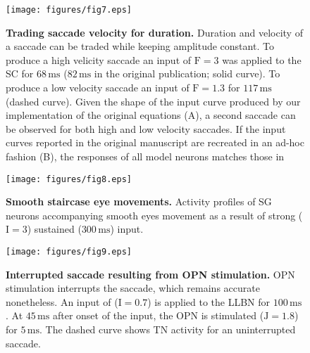\documentclass[10pt,a4paper,onecolumn]{article}
\renewcommand{\includegraphics}[2][]{\OldIncludegraphics[width=12cm, #1]{#2}}
\begin{document}
\begin{figure}
\centering
\texttt{[image: figures/fig7.eps]}
\caption{\textbf{Trading saccade velocity for duration.} Duration and
velocity of a saccade can be traded while keeping amplitude constant. To
produce a high velicity saccade an input of \(\mathrm{F=3}\) was applied
to the SC for \(68\,\mathrm{ms}\) (\(82\,\mathrm{ms}\) in the original
publication; solid curve). To produce a low velocity saccade an input of
\(\mathrm{F=1.3}\) for \(117\,\mathrm{ms}\) (dashed curve). Given the
shape of the input curve produced by our implementation of the original
equations (A), a second saccade can be observed for both high and low
velocity saccades. If the input curves reported in the original
manuscript are recreated in an ad-hoc fashion (B), the responses of all
model neurons matches those in \autocite{Gancarz1998}\label{fig:fig_7}}
\end{figure}

\begin{figure}
\centering
\texttt{[image: figures/fig8.eps]}
\caption{\textbf{Smooth staircase eye movements.} Activity profiles of
SG neurons accompanying smooth eyes movement as a result of strong
(\(\mathrm{I=3}\)) sustained (\(300\,\mathrm{ms}\))
input.\label{fig:fig_8}}
\end{figure}

\pagebreak

\begin{figure}
\centering
\texttt{[image: figures/fig9.eps]}
\caption{\textbf{Interrupted saccade resulting from OPN stimulation.}
OPN stimulation interrupts the saccade, which remains accurate
nonetheless. An input of (\(\mathrm{I=0.7}\)) is applied to the LLBN for
\(100\,\mathrm{ms}\). At \(45\,\mathrm{ms}\) after onset of the input,
the OPN is stimulated (\(\mathrm{J=1.8}\)) for \(5\,\mathrm{ms}\). The
dashed curve shows TN activity for an uninterrupted
saccade.\label{fig:fig_9}}
\end{figure}
\end{document}
